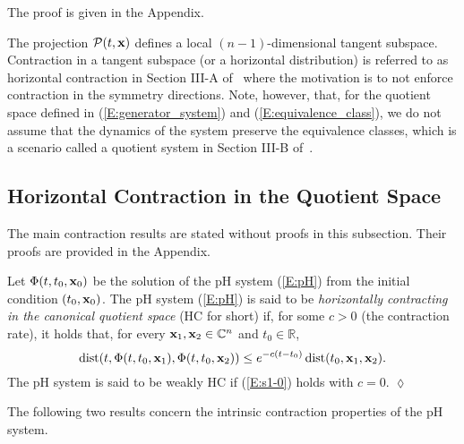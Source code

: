 The proof is given in the Appendix.

\begin{remark}
The projection $\mathcal P(t, \mathbf{x})$ defines a local $(n {-} 1)$-dimensional tangent subspace.
Contraction in a tangent subspace (or a horizontal distribution) is referred to as horizontal contraction in Section III-A of~\cite{forni2013differential} where the motivation is to not enforce contraction in the symmetry directions. Note, however, that, for the quotient space defined in (\ref{E:generator_system}) and (\ref{E:equivalence_class}), we do not assume that the dynamics of the system preserve the equivalence classes, which is a scenario called a quotient system in Section III-B of~\cite{forni2013differential}.
\end{remark}


\subsection{Horizontal Contraction in the Quotient Space}

The main contraction results are stated without proofs in this subsection. Their proofs are provided in the Appendix.


\begin{definition}
Let $\Phi(t, t_0, \mathbf{x}_0)$ be the solution of the pH system (\ref{E:pH}) from the initial condition $(t_0, \mathbf{x}_0)$.
The pH system (\ref{E:pH}) is said to be \emph{horizontally contracting in the canonical quotient space} (HC for short) if, for some $c > 0$ (the contraction rate), it holds that, for every $\mathbf{x}_1, \mathbf{x}_2 \in \mathbb{C}^n$ and $t_0\in \mathbb{R}$,
\begin{equation} \label{E:s1-0} 
    \operatorname*{dist}(t, \Phi(t, t_0, \mathbf{x}_1), \Phi(t, t_0,  \mathbf{x}_2)) \leq e^{-c(t - t_0)} \operatorname*{dist}(t_0, \mathbf{x}_1, \mathbf{x}_2).
\end{equation}
The pH system is said to be weakly HC if (\ref{E:s1-0}) holds with $c = 0$. \hfill $\lozenge$
\end{definition}



The following two results concern the intrinsic contraction properties of the pH system.

